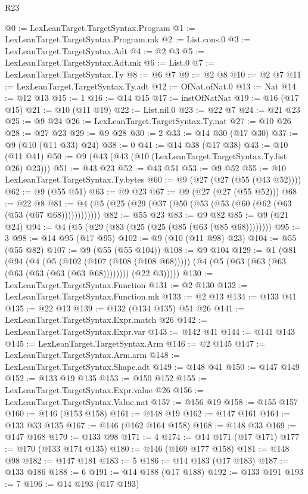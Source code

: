 \begin{lexlean}{R23}
\begin{coremodule}
@0 := LexLeanTarget.TargetSyntax.Program
@1 := LexLeanTarget.TargetSyntax.Program.mk
@2 := List.cons.{0}
@3 := LexLeanTarget.TargetSyntax.Adt
@4 := @2 @3
@5 := LexLeanTarget.TargetSyntax.Adt.mk
@6 := List.{0}
@7 := LexLeanTarget.TargetSyntax.Ty
@8 := @6 @7
@9 := @2 @8
@10 := @2 @7
@11 := LexLeanTarget.TargetSyntax.Ty.adt
@12 := OfNat.ofNat.{0}
@13 := Nat
@14 := @12 @13
@15 := 1
@16 := @14 @15
@17 := instOfNatNat
@19 := @16 (@17 @15)
@21 := @10 (@11 @19)
@22 := List.nil.{0}
@23 := @22 @7
@24 := @21 @23
@25 := @9 @24
@26 := LexLeanTarget.TargetSyntax.Ty.nat
@27 := @10 @26
@28 := @27 @23
@29 := @9 @28
@30 := 2
@33 := @14 @30 (@17 @30)
@37 := @9 (@10 (@11 @33) @24)
@38 := 0
@41 := @14 @38 (@17 @38)
@43 := @10 (@11 @41)
@50 := @9 (@43 (@43 (@10 (LexLeanTarget.TargetSyntax.Ty.list @26) @23)))
@51 := @43 @23
@52 := @43 @51
@53 := @9 @52
@55 := @10 LexLeanTarget.TargetSyntax.Ty.bytes
@60 := @9 (@27 (@27 (@55 (@43 @52))))
@62 := @9 (@55 @51)
@63 := @9 @23
@67 := @9 (@27 (@27 (@55 @52)))
@68 := @22 @8
@81 := @4 (@5 (@25 (@29 (@37 (@50 (@53 (@53 (@60 (@62 (@63 (@53 (@67 @68))))))))))))
@82 := @55 @23
@83 := @9 @82
@85 := @9 (@21 @24)
@94 := @4 (@5 (@29 (@83 (@25 (@25 (@85 (@63 (@85 @68))))))))
@95 := 3
@98 := @14 @95 (@17 @95)
@102 := @9 (@10 (@11 @98) @23)
@104 := @55 (@55 @82)
@107 := @9 (@55 (@55 @104))
@108 := @9 @104
@129 := @1
    (@81
      (@94
        (@4
          (@5 (@102 (@107 (@108 (@108 @68)))))
          (@4 (@5 (@63 (@63 (@63 (@63 (@63 (@63 (@63 @68)))))))) (@22 @3)))))
@130 := LexLeanTarget.TargetSyntax.Function
@131 := @2 @130
@132 := LexLeanTarget.TargetSyntax.Function.mk
@133 := @2 @13
@134 := @133 @41
@135 := @22 @13
@139 := @132 (@134 @135) @51 @26
@141 := LexLeanTarget.TargetSyntax.Expr.match @26
@142 := LexLeanTarget.TargetSyntax.Expr.var
@143 := @142 @41
@144 := @141 @143
@145 := LexLeanTarget.TargetSyntax.Arm
@146 := @2 @145
@147 := LexLeanTarget.TargetSyntax.Arm.arm
@148 := LexLeanTarget.TargetSyntax.Shape.adt
@149 := @148 @41
@150 := @147 @149
@152 := @133 @19 @135
@153 := @150 @152
@155 := LexLeanTarget.TargetSyntax.Expr.value @26
@156 := LexLeanTarget.TargetSyntax.Value.nat
@157 := @156 @19
@158 := @155 @157
@160 := @146 (@153 @158)
@161 := @148 @19
@162 := @147 @161
@164 := @133 @33 @135
@167 := @146 (@162 @164 @158)
@168 := @148 @33
@169 := @147 @168
@170 := @133 @98
@171 := 4
@174 := @14 @171 (@17 @171)
@177 := @170 (@133 @174 @135)
@180 := @146 (@169 @177 @158)
@181 := @148 @98
@182 := @147 @181
@183 := 5
@186 := @14 @183 (@17 @183)
@187 := @133 @186
@188 := 6
@191 := @14 @188 (@17 @188)
@192 := @133 @191
@193 := 7
@196 := @14 @193 (@17 @193)

\end{coremodule}
\end{lexlean}
